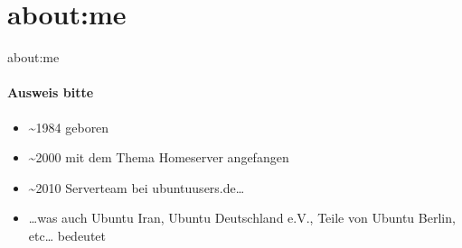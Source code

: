 \section{about:me}

\begin{frame}{about:me}
\framesubtitle{Ausweis bitte}
\begin{itemize}
\item \textasciitilde{}1984 geboren
\pause
\item \textasciitilde{}2000 mit dem Thema Homeserver angefangen
\pause
\item \textasciitilde{}2010 Serverteam bei ubuntuusers.de…
\pause
\item …was auch Ubuntu Iran, Ubuntu Deutschland e.V., Teile von Ubuntu Berlin, etc… bedeutet
\end{itemize}
\end{frame}
